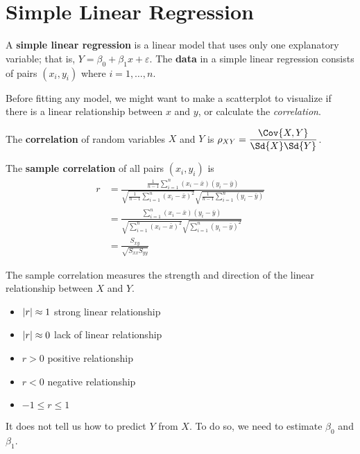 \section{Simple Linear Regression}
\begin{definition}
    A \textbf{simple linear regression}
    is a linear model that uses only one
    explanatory variable; that is,
    $ Y=\beta_0+\beta_1x+\varepsilon $.
    The \textbf{data}
    in a simple linear regression consists of pairs $ (x_i,y_i) $
    where $ i=1,\ldots,n $.
\end{definition}
\begin{remark}
    Before fitting any model, we might want
    to make a scatterplot to visualize if there
    is a linear relationship between $ x $ and $ y $,
    or calculate the \emph{correlation}.
\end{remark}
\begin{definition}
    The \textbf{correlation} of
    random variables $ X $ and $ Y $ is
    $ \rho_{XY}=\dfrac{\Cov{X,Y}}{\Sd{X}\Sd{Y}} $.
\end{definition}
\begin{definition}
    The \textbf{sample correlation} of
    all pairs $ (x_i,y_i) $ is
    \begin{align*}
        r
         & =\frac{\frac{1}{n-1} \sum_{i=1}^{n}(x_i-\bar{x})(y_i-\bar{y})}
        {\sqrt{\frac{1}{n-1}\sum_{i=1}^{n} (x_i-\bar{x})^2}
            \sqrt{\frac{1}{n-1}\sum_{i=1}^{n}(y_i-\bar{y})}}              \\
         & =\frac{\sum_{i=1}^{n} (x_i-\bar{x})(y_i-\bar{y})}{
            \sqrt{\sum_{i=1}^{n} (x_i-\bar{x})^2}
            \sqrt{\sum_{i=1}^{n} (y_i-\bar{y})^2}
        }                                                                 \\
         & =\frac{S_{xy}}{\sqrt{S_{xx}S_{yy}}}
    \end{align*}
\end{definition}
The sample correlation measures the strength and direction of
the linear relationship between $ X $ and $ Y $.
\begin{itemize}
    \item $ \lvert r\rvert\approx 1 $ strong linear relationship
    \item $ \lvert r\rvert\approx 0 $ lack of linear relationship
    \item $ r>0 $ positive relationship
    \item $ r<0 $ negative relationship
    \item $ -1\leqslant r\leqslant 1 $
\end{itemize}
It does not tell us how to predict $ Y $ from $ X $. To do so,
we need to estimate $ \beta_0 $ and $ \beta_1 $.

